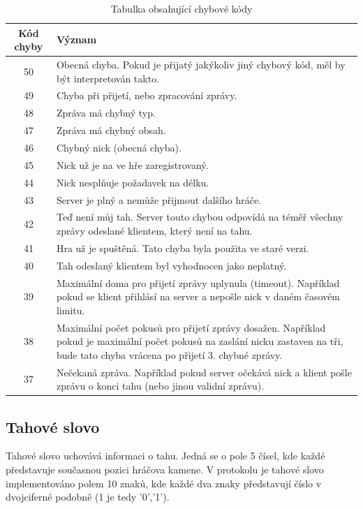 \documentclass[11pt,a4paper]{scrartcl}
\begin{document}
\begin{center}
		\begin{longtable} {| c | p{12cm} | }
			\caption{Tabulka obsahující chybové kódy} \\
			
			\hline
			Kód chyby & Význam \\
			\hline
			\hline
			50 & Obecná chyba. Pokud je přijatý jakýkoliv jiný chybový kód, měl by být interpretován takto.\\
			\hline
			49 & Chyba při přijetí, nebo zpracování zprávy.\\
			\hline
			48 & Zpráva má chybný typ.\\
			\hline
			47 & Zpráva má chybný obsah. \\
			\hline
			46 & Chybný nick (obecná chyba).\\
			\hline
			45 & Nick už je na ve hře zaregistrovaný.\\
			\hline
			44 & Nick nesplňuje požadavek na délku.\\
			\hline
			43 & Server je plný a nemůže přijmout dalšího hráče.\\
			\hline
			42 & Teď není můj tah. Server touto chybou odpovídá na téměř všechny zprávy odeslané klientem, který není na tahu.\\
			\hline
			41 & Hra už je spuštěná. Tato chyba byla použita ve staré verzi.\\
			\hline
			40 & Tah odeslaný klientem byl vyhodnocen jako neplatný.\\
			\hline
			39 & Maximální doma pro přijetí zprávy uplynula (timeout). Například pokud se klient přihlásí na server a nepošle nick v daném časovém limitu.\\
			\hline
			38 & Maximální počet pokusů pro přijetí zprávy dosažen. Například pokud je maximální počet pokusů na zaslání nicku zastaven na tři, bude tato chyba vrácena po přijetí 3. chybné zprávy.\\
			\hline
			37 & Nečekaná zpráva. Například pokud server očekává nick a klient pošle zprávu o konci tahu (nebo jinou validní zprávu).\\
			\hline
		\end{longtable}
	\end{center}


	\subsection{Tahové slovo}
	Tahové slovo uchovává informaci o tahu. Jedná se o pole 5 čísel, kde každé představuje současnou pozici hráčova kamene. V protokolu je tahové slovo implementováno polem 10 znaků, kde každé dva znaky představují číslo v dvojciferné podobně (1 je tedy '0','1').
	
\end{document}
